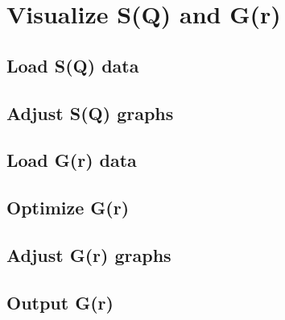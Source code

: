\section{Visualize S(Q) and G(r)}
\subsection{Load S(Q) data}
\subsection{Adjust S(Q) graphs}
\subsection{Load G(r) data}
\subsection{Optimize G(r)}
\subsection{Adjust G(r) graphs}
\subsection{Output G(r)}
